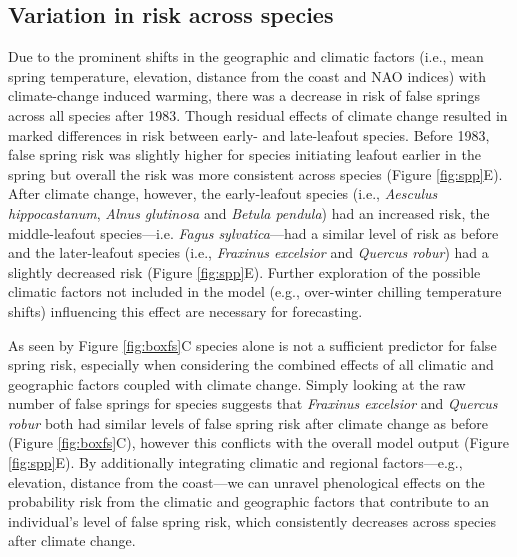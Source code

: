 \documentclass{article}\usepackage[]{graphicx}\usepackage[]{color}
\begin{document}
\subsection*{Variation in risk across species} 
Due to the prominent shifts in the geographic and climatic factors (i.e., mean spring temperature, elevation, distance from the coast and NAO indices) with climate-change induced warming, there was a decrease in risk of false springs across all species after 1983. Though residual effects of climate change resulted in marked differences in risk between early- and late-leafout species. Before 1983, false spring risk was slightly higher for species initiating leafout earlier in the spring but overall the risk was more consistent across species (Figure \ref{fig:spp}E). After climate change, however, the early-leafout species (i.e., \textit{Aesculus hippocastanum}, \textit{Alnus glutinosa} and \textit{Betula pendula}) had an increased risk, the middle-leafout species---i.e. \textit{Fagus sylvatica}---had a similar level of risk as before and the later-leafout species (i.e., \textit{Fraxinus excelsior} and \textit{Quercus robur}) had a slightly decreased risk (Figure \ref{fig:spp}E). %
Further exploration of the possible climatic factors not included in the model (e.g., over-winter chilling temperature shifts) influencing this effect are necessary for forecasting. 

As seen by Figure \ref{fig:boxfs}C species alone is not a sufficient predictor for false spring risk, especially when considering the combined effects of all climatic and geographic factors coupled with climate change. Simply looking at the raw number of false springs for species suggests that \textit{Fraxinus excelsior} and \textit{Quercus robur} both had similar levels of false spring risk after climate change as before (Figure \ref{fig:boxfs}C), however this conflicts with the overall model output (Figure \ref{fig:spp}E). By additionally integrating climatic and regional factors---e.g., elevation, distance from the coast---we can unravel phenological effects on the probability risk from the climatic and geographic factors that contribute to an individual's level of false spring risk, which consistently decreases across species after climate change.
\end{document}

